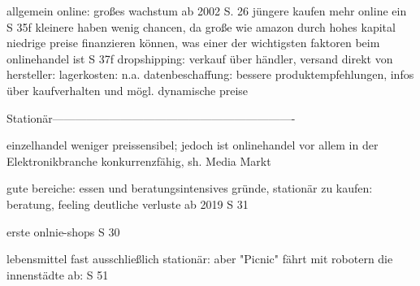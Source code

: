     
    
    
        
        allgemein online: großes wachstum ab 2002 S. 26
            jüngere kaufen mehr online ein S 35f
            kleinere haben wenig chancen, da große wie amazon durch hohes kapital niedrige preise finanzieren können, was einer der wichtigsten faktoren beim onlinehandel ist S 37f
            dropshipping: verkauf über händler, versand direkt von hersteller: lagerkosten: n.a.
            datenbeschaffung: bessere produktempfehlungen, infos über kaufverhalten und mögl. dynamische preise
            
    
        
        Stationär----------------------------------------------------------------


            einzelhandel weniger preissensibel; jedoch ist onlinehandel vor allem in der Elektronikbranche konkurrenzfähig, sh. Media Markt\cite[S. 21f]{Graf}

        gute bereiche: essen und beratungsintensives
        gründe, stationär zu kaufen: beratung, feeling
            deutliche verluste ab 2019 S 31
            
            erste onlnie-shops S 30
            
            lebensmittel fast ausschließlich stationär: aber "Picnic" fährt mit robotern die innenstädte ab: S 51


            
\fi

